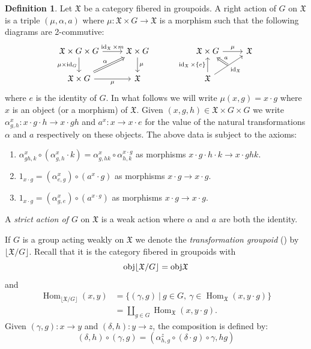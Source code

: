 \documentclass[12pt, final]{amsart}
\theoremstyle{remark}
\theoremstyle{definition}
\newtheorem{definition}[example]{Definition}
\theoremstyle{plain}
\newcommand{\fX}{{\mathfrak X}}
\DeclareMathOperator{\id}{id}
\DeclareMathOperator{\Hom}{Hom}
\begin{document}
\begin{definition}\label{d:weakAction}    
    Let $\fX$ be a category fibered in groupoids. 
    A right action of $G$ on $\fX$ is a triple 
    $(\mu, \alpha, a)$ where $\mu: \fX\times G\to \fX$ is a morphism such that 
    the following diagrams are 2-commutive:
    $$
    \begin{tikzcd}
        {\fX\times G \times G} & {\fX\times G} && {\fX\times G} & \fX \\
        {\fX\times G} & \fX && \fX
        \arrow["{\id_\fX\times m}", from=1-1, to=1-2]
        \arrow["{\mu\times \id_G}"', from=1-1, to=2-1]
        \arrow["\mu", from=1-2, to=2-2]
        \arrow["\mu", from=1-4, to=1-5]
        \arrow["\alpha", Rightarrow, from=2-1, to=1-2]
        \arrow["\mu"', from=2-1, to=2-2]
        \arrow["{\id_\fX\times \{e\}}", from=2-4, to=1-4]
        \arrow[""{name=0, anchor=center, inner sep=0}, "{\id_\fX}"', from=2-4, to=1-5]
        \arrow["a"', Rightarrow, from=0, to=1-4]
    \end{tikzcd}
    $$
    where $e$ is the identity of $G$. 
    In what follows we will write $\mu(x,g)=x\cdot g$ where $x$ is an object (or a morphism) 
    of  $\fX$. Given $(x,g,h)\in \fX\times G\times G$ we write 
    $\alpha^{x}_{g,h}:x\cdot g \cdot h \to x \cdot gh$ and $a^x:x \to x\cdot e$
    for the value of the natural transformations $\alpha$ and $a$ respectively on 
    these objects. The above data is subject to the axioms:
    \begin{enumerate}
        \item $\alpha_{gh,k}^{x}\circ (\alpha_{g,h}^{x}\cdot k) = \alpha_{g,hk}^{x} \circ \alpha_{h,k}^{x\cdot g}$ as morphisms $x\cdot g \cdot h \cdot k \to x\cdot ghk$.
        \item $1_{x\cdot g}=(\alpha^{x}_{e,g})\circ (a^{x}\cdot g)$ as morphisms $x\cdot g \to x \cdot g$.
        \item $1_{x\cdot g}=(\alpha^{x}_{g,e})\circ (a^{x\cdot g})$ as morphisms $x\cdot g \to x \cdot g$. 
    \end{enumerate}
    A \emph{strict action of $G$} on $\fX$ is a weak action where $\alpha$ and $a$ are both the identity. 
\end{definition}



If $G$ is a group acting weakly on $\fX$ we denote the 
\emph{transformation groupoid} (\cite[\S 3]{ginot}) by $\lfloor\fX/G \rfloor$.  Recall that it is the category fibered in groupoids with 
$$
{\rm obj}\lfloor\fX/G \rfloor = {\rm obj}\fX
$$
and 
\begin{align*}
    \Hom_{\lfloor\fX/G \rfloor}(x,y) &= \{ (\gamma, g) \ | \  g\in G,\  \gamma\in \Hom_\fX(x,y\cdot g)\} \\ 
    &= \coprod_{g\in G} \Hom_{\fX}(x,y\cdot g). 
\end{align*} 
Given $(\gamma, g): x \to y$ and $(\delta, h): y \to z$, the composition is defined by: 
$$
(\delta , h) \circ (\gamma, g) = (\alpha_{h,g}^{z}\circ(\delta\cdot g)\circ \gamma, hg) 
$$
\end{document}
